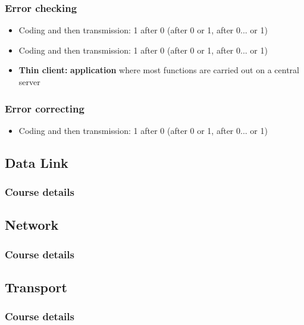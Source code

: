   \begin{frame}
    \frametitle{Error checking}
      \begin{itemize}
        \item Coding and then transmission: 1 after 0 (after 0 or 1, after 0... or 1)\pause
        \item Coding and then transmission: 1 after 0 (after 0 or 1, after 0... or 1)\pause
        \item \textbf{Thin client:} \textbf{application} where most functions are carried out on a central server
      \end{itemize}
  \end{frame}
  \begin{frame}
    \frametitle{Error correcting}
      \begin{itemize}
        \item Coding and then transmission: 1 after 0 (after 0 or 1, after 0... or 1)\pause
      \end{itemize}
  \end{frame}

  \begin{frame}
    \frametitle{}
  \end{frame}
\subsection{Data Link}
  \begin{frame}
    \frametitle{Course details}
  \end{frame}
\subsection{Network}
  \begin{frame}
    \frametitle{Course details}
  \end{frame}
\subsection{Transport}
  \begin{frame}
    \frametitle{Course details}
  \end{frame}
